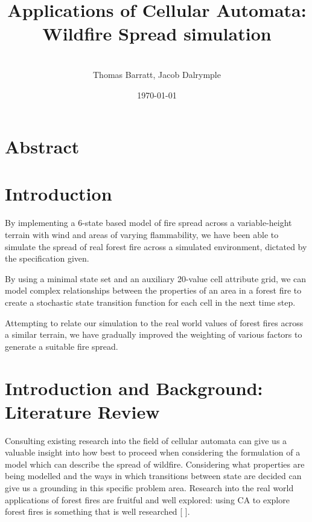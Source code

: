 \documentclass[11pt, a4paper, titlepage]{article}
\date{}
\title{ \textbf{Applications of Cellular Automata: Wildfire Spread simulation} \\  }
\author{\\ \Large{Thomas Barratt, Jacob Dalrymple  } }
\date{\today}
\begin{document}
\maketitle

\newpage

\section{Abstract}

\section{Introduction}
By implementing a 6-state based model of fire spread across a variable-height terrain with wind and areas of varying flammability, we have been able to simulate the spread of real forest fire across a simulated environment, dictated by the specification given.

By using a minimal state set and an auxiliary 20-value cell attribute grid, we can model complex relationships between the properties of an area in a forest fire to create a stochastic state transition function for each cell in the next time step.

Attempting to relate our simulation to the real world values of forest fires across a similar terrain, we have gradually improved the weighting of various factors to generate a suitable fire spread. 

\section{Introduction and Background: Literature Review}
Consulting existing research into the field of cellular automata can give us a valuable insight into how best to proceed when considering the formulation of a model which can describe the spread of wildfire. Considering what properties are being modelled and the ways in which transitions between state are decided can give us a grounding in this specific problem area. Research into the real world applications of forest fires are fruitful and well explored: using CA to explore forest fires is something that is well researched [\cite{ntinas2017parallel}
\cite{clarke1994cellular}
\cite{trunfio2011new}].
\end{document}
